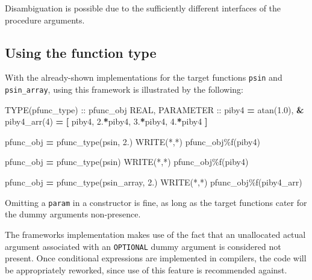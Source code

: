 \documentclass[]{scrartcl}
\newenvironment{Shaded}{}{}
\newcommand{\BuiltInTok}[1]{\textcolor[rgb]{0.00,0.50,0.00}{#1}}
\newcommand{\DataTypeTok}[1]{\textcolor[rgb]{0.56,0.13,0.00}{#1}}
\newcommand{\DecValTok}[1]{\textcolor[rgb]{0.25,0.63,0.44}{#1}}
\newcommand{\FloatTok}[1]{\textcolor[rgb]{0.25,0.63,0.44}{#1}}
\newcommand{\FunctionTok}[1]{\textcolor[rgb]{0.02,0.16,0.49}{#1}}
\newcommand{\KeywordTok}[1]{\textcolor[rgb]{0.00,0.44,0.13}{\textbf{#1}}}
\newcommand{\NormalTok}[1]{#1}
\newcommand{\OperatorTok}[1]{\textcolor[rgb]{0.40,0.40,0.40}{#1}}
\begin{document}
Disambiguation is possible due to the sufficiently different interfaces
of the procedure arguments.

\subsection{Using the function type}\label{using-the-function-type}

With the already-shown implementations for the target functions
\texttt{psin} and \texttt{psin\_array}, using this framework is
illustrated by the following:

\begin{Shaded}
\begin{Highlighting}[]
\DataTypeTok{TYPE(pfunc\_type)} \DataTypeTok{::}\NormalTok{ pfunc\_obj}
\DataTypeTok{REAL}\NormalTok{, }\DataTypeTok{PARAMETER} \DataTypeTok{::}\NormalTok{ piby4 }\KeywordTok{=} \BuiltInTok{atan}\NormalTok{(}\FloatTok{1.0}\NormalTok{), }\KeywordTok{\&}
\NormalTok{   piby4\_arr(}\DecValTok{4}\NormalTok{) }\KeywordTok{=} \KeywordTok{[}\NormalTok{ piby4, }\FloatTok{2.}\KeywordTok{*}\NormalTok{piby4, }\FloatTok{3.}\KeywordTok{*}\NormalTok{piby4, }\FloatTok{4.}\KeywordTok{*}\NormalTok{piby4 }\KeywordTok{]}

\NormalTok{pfunc\_obj }\KeywordTok{=}\NormalTok{ pfunc\_type(psin, }\FloatTok{2.}\NormalTok{)}
\FunctionTok{WRITE(*}\NormalTok{,}\FunctionTok{*)}\NormalTok{ pfunc\_obj}\OperatorTok{\%}\NormalTok{f(piby4)}

\NormalTok{pfunc\_obj }\KeywordTok{=}\NormalTok{ pfunc\_type(psin)}
\FunctionTok{WRITE(*}\NormalTok{,}\FunctionTok{*)}\NormalTok{ pfunc\_obj}\OperatorTok{\%}\NormalTok{f(piby4)}

\NormalTok{pfunc\_obj }\KeywordTok{=}\NormalTok{ pfunc\_type(psin\_array, }\FloatTok{2.}\NormalTok{)}
\FunctionTok{WRITE(*}\NormalTok{,}\FunctionTok{*)}\NormalTok{ pfunc\_obj}\OperatorTok{\%}\NormalTok{f(piby4\_arr)}
\end{Highlighting}
\end{Shaded}

Omitting a \texttt{param} in a constructor is fine, as long as the
target functions cater for the dummy argument\textquotesingle s
non-presence.

The framework\textquotesingle s implementation makes use of the fact
that an unallocated actual argument associated with an \texttt{OPTIONAL}
dummy argument is considered not present. Once conditional expressions
are implemented in compilers, the code will be appropriately reworked,
since use of this feature is recommended against.
\end{document}

